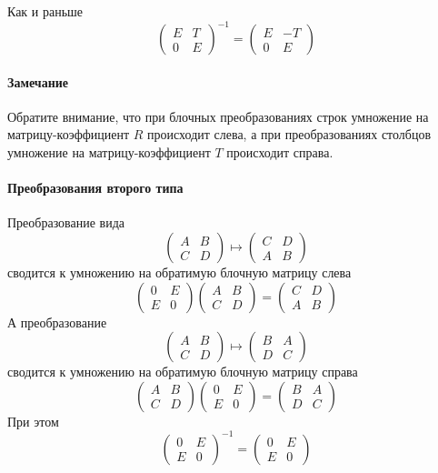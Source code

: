 Как и раньше
\[
\begin{pmatrix}
{E}&{T}\\
{0}&{E}
\end{pmatrix}^{-1}
=
\begin{pmatrix}
{E}&{-T}\\
{0}&{E}
\end{pmatrix}
\]

\paragraph{Замечание}

Обратите внимание, что при блочных преобразованиях строк умножение на матрицу-коэффициент $R$ происходит слева, а при преобразованиях столбцов умножение на матрицу-коэффициент $T$ происходит справа.

\paragraph{Преобразования второго типа}

Преобразование вида
\[
\begin{pmatrix}
{A}&{B}\\
{C}&{D}
\end{pmatrix}
\mapsto
\begin{pmatrix}
{C}&{D}\\
{A}&{B}
\end{pmatrix}
\]
сводится к умножению на обратимую блочную матрицу слева
\[
\begin{pmatrix}
{0}&{E}\\
{E}&{0}
\end{pmatrix}
\begin{pmatrix}
{A}&{B}\\
{C}&{D}
\end{pmatrix}
=
\begin{pmatrix}
{C}&{D}\\
{A}&{B}
\end{pmatrix}
\]
А преобразование
\[
\begin{pmatrix}
{A}&{B}\\
{C}&{D}
\end{pmatrix}
\mapsto
\begin{pmatrix}
{B}&{A}\\
{D}&{C}
\end{pmatrix}
\]
сводится к умножению на обратимую блочную матрицу справа
\[
\begin{pmatrix}
{A}&{B}\\
{C}&{D}
\end{pmatrix}
\begin{pmatrix}
{0}&{E}\\
{E}&{0}
\end{pmatrix}
=
\begin{pmatrix}
{B}&{A}\\
{D}&{C}
\end{pmatrix}
\]
При этом
\[
\begin{pmatrix}
{0}&{E}\\
{E}&{0}
\end{pmatrix}^{-1}
=
\begin{pmatrix}
{0}&{E}\\
{E}&{0}
\end{pmatrix}
\]

